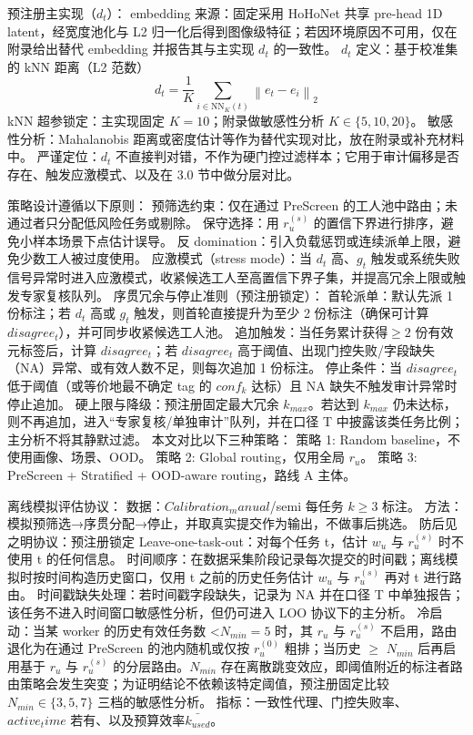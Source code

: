 \documentclass[journal,onecolumn]{IEEEtran}
\begin{document}
预注册主实现（$d_t$）：
embedding 来源：固定采用 HoHoNet 共享 pre-head 1D latent，经宽度池化与 L2 归一化后得到图像级特征；若因环境原因不可用，仅在附录给出替代 embedding 并报告其与主实现 $d_t$ 的一致性。
$d_t$ 定义：基于校准集的 kNN 距离（L2 范数）
\[d_t = \frac{1}{K}\sum_{i\in \mathrm{NN}_{K}(t)}\left\|e_t-e_i\right\|_{2}\]
kNN 超参锁定：主实现固定 $K=10$；附录做敏感性分析 $K\in\{5,10,20\}$。
敏感性分析：Mahalanobis 距离或密度估计等作为替代实现对比，放在附录或补充材料中。
严谨定位：$d_t$ 不直接判对错，不作为硬门控过滤样本；它用于审计偏移是否存在、触发应激模式、以及在 3.0 节中做分层对比。

策略设计遵循以下原则：
预筛选约束：仅在通过 PreScreen 的工人池中路由；未通过者只分配低风险任务或剔除。
保守选择：用 $r_u^{\left(s\right)}$ 的置信下界进行排序，避免小样本场景下点估计误导。
反 domination：引入负载惩罚或连续派单上限，避免少数工人被过度使用。
应激模式（stress mode）：当 $d_t$ 高、$g_t$ 触发或系统失败信号异常时进入应激模式，收紧候选工人至高置信下界子集，并提高冗余上限或触发专家复核队列。
序贯冗余与停止准则（预注册锁定）：
首轮派单：默认先派 1 份标注；若 $d_t$ 高或 $g_t$ 触发，则首轮直接提升为至少 2 份标注（确保可计算 $disagree_t$），并可同步收紧候选工人池。
追加触发：当任务累计获得$\geq2$ 份有效元标签后，计算 $disagree_t$；若 $disagree_t$ 高于阈值、出现门控失败/字段缺失（NA）异常、或有效人数不足，则每次追加 1 份标注。
停止条件：当 $disagree_t$ 低于阈值（或等价地最不确定 tag 的 $conf_k$ 达标）且 NA 缺失不触发审计异常时停止追加。
硬上限与降级：预注册固定最大冗余 $k_{max}$。若达到 $k_{max}$ 仍未达标，则不再追加，进入“专家复核/单独审计”队列，并在口径 T 中披露该类任务比例；主分析不将其静默过滤。
本文对比以下三种策略：
策略 1: Random baseline，不使用画像、场景、OOD。
策略 2: Global routing，仅用全局 $r_u$。
策略 3: PreScreen + Stratified + OOD-aware routing，路线 A 主体。

离线模拟评估协议：
数据：$Calibration_manual$/semi 每任务 $k\geq3$ 标注。
方法：模拟预筛选→序贯分配→停止，并取真实提交作为输出，不做事后挑选。
防后见之明协议：预注册锁定
Leave-one-task-out：对每个任务 t，估计 $w_u$ 与 $r_u^{\left(s\right)}$ 时不使用 t 的任何信息。
时间顺序：在数据采集阶段记录每次提交的时间戳；离线模拟时按时间构造历史窗口，仅用 t 之前的历史任务估计 $w_u$ 与 $r_u^{\left(s\right)}$ 再对 t 进行路由。
时间戳缺失处理：若时间戳字段缺失，记录为 NA 并在口径 T 中单独报告；该任务不进入时间窗口敏感性分析，但仍可进入 LOO 协议下的主分析。
冷启动：当某 worker 的历史有效任务数 <$N_{min}=5$ 时，其 $r_u$ 与 $r_u^{\left(s\right)}$ 不启用，路由退化为在通过 PreScreen 的池内随机或仅按 $r_u^{\left(0\right)}$ 粗排；当历史 $\geq$ $N_{min}$ 后再启用基于 $r_u$ 与 $r_u^{\left(s\right)}$ 的分层路由。$N_{min}$ 存在离散跳变效应，即阈值附近的标注者路由策略会发生突变；为证明结论不依赖该特定阈值，预注册固定比较 $N_{min}\in\{3,5,7\}$ 三档的敏感性分析。
指标：一致性代理、门控失败率、$active_time$ 若有、以及预算效率$\bar{k_{used}}$。
\end{document}
